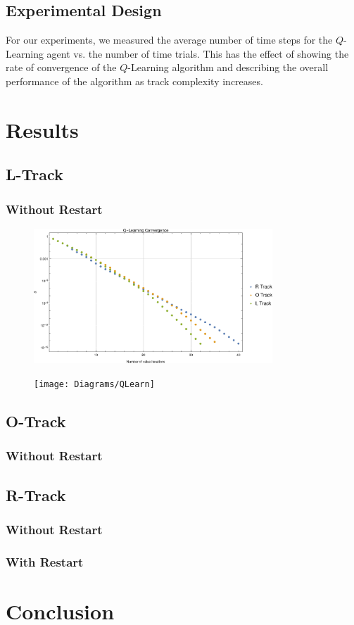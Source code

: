 \documentclass{article}
\begin{document}
		\subsection{Experimental Design}
		
			For our experiments, we measured the average number of time steps for the $Q$-Learning agent vs. the number of time trials. This has the effect of showing the rate of convergence of the $Q$-Learning algorithm and describing the overall performance of the algorithm as track complexity increases.
		
	\section{Results}
		\subsection{L-Track}
			\subsubsection{Without Restart}
			
				\begin{figure}[h!]
					\centering
					\includegraphics[width=0.8\textwidth]{Diagrams/VIter}
					\caption{}
					\label{VIter}
				\end{figure}
				
				
				
				\begin{figure}[h!]
					\centering
					\texttt{[image: Diagrams/QLearn]}
					\caption{}
					\label{QLearn}
				\end{figure}
			
		\subsection{O-Track}
			\subsubsection{Without Restart}
		\subsection{R-Track}
			\subsubsection{Without Restart}
			\subsubsection{With Restart}
	\section{Conclusion}


		
	
\end{document}
